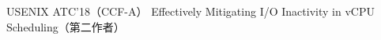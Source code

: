 \cvpub
{USENIX ATC'18（CCF-A）} %
{Effectively Mitigating I/O Inactivity in vCPU Scheduling（第二作者）} %
{} %
{} %
{ %
}
